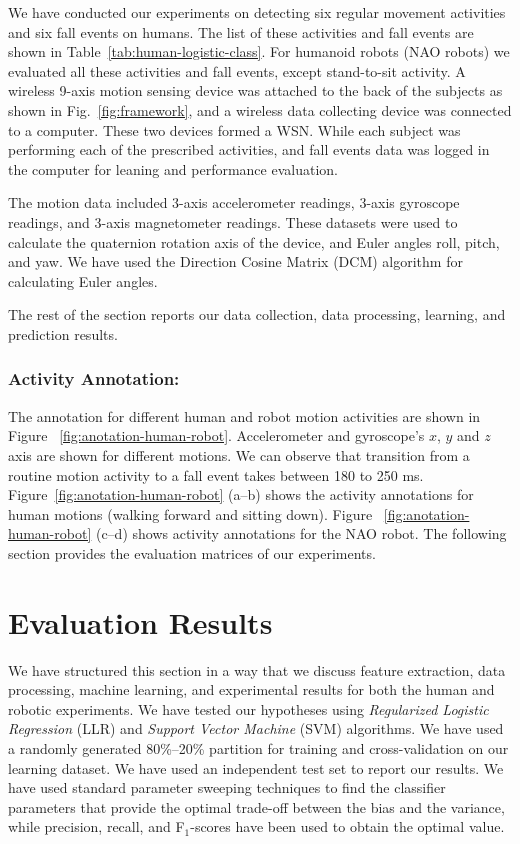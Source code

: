 \documentclass[letterpaper]{article}
\begin{document}
\begin{sloppy}
We have conducted our experiments on detecting six regular movement activities and six fall events on 
humans. The list of these activities and fall events are shown in Table~\ref{tab:human-logistic-class}. For humanoid robots (NAO robots) we evaluated all these activities and fall events, except stand-to-sit activity. 
 A wireless 9-axis  motion sensing device was attached to the back of the subjects as shown in Fig.~\ref{fig:framework}, and a wireless data collecting device was connected to a computer. These two devices formed a WSN. While each subject was performing each of the prescribed activities, and fall events data was logged in the computer for leaning and performance evaluation.
\par
The motion data included 3-axis accelerometer readings, 3-axis gyroscope readings, and 3-axis magnetometer readings. These datasets were used to calculate
the quaternion rotation axis of the device, and Euler angles roll, pitch, and yaw. We have used the Direction Cosine Matrix (DCM) algorithm for calculating Euler angles. 
\par
The rest of the  section reports our data collection, data processing, learning, 
and prediction results.


\subsubsection{Activity Annotation:} The annotation for different human and robot motion activities 
are shown in 
Figure {~\ref{fig:anotation-human-robot}}. 
Accelerometer and gyroscope's $x$, $y$ and $z$ axis are shown for different motions. We can observe 
that transition from a routine motion activity to a fall event 
takes between 180 to 250 ms. Figure{~\ref{fig:anotation-human-robot}} (a--b) shows the 
activity annotations for human motions (walking forward and sitting down). 
Figure {~\ref{fig:anotation-human-robot}}
(c--d) shows activity annotations for the NAO robot. The following section provides the evaluation 
matrices of our experiments. 


\section{Evaluation Results}
We have structured this section in a way that we discuss feature extraction, data processing, 
machine learning, and experimental results for both the human and robotic experiments. We have 
tested our hypotheses using  {\em Regularized Logistic Regression} (LLR) and {\em Support 
Vector Machine} (SVM) algorithms. We have used a randomly generated 80\%--20\% partition for 
training and cross-validation on our learning dataset. We have used an independent test set to 
report our results. We have used standard parameter sweeping techniques to find the classifier 
parameters that provide the optimal trade-off between the bias and the variance, while precision, 
recall, and F$_1$-scores have been used to obtain the optimal value. 


\end{sloppy}
\end{document}

